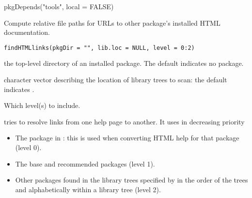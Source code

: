 %
\begin{SeeAlso}\relax
{}
\end{SeeAlso}
%
\begin{Examples}
\begin{ExampleCode}
pkgDepends("tools", local = FALSE)
\end{ExampleCode}
\end{Examples}
%
\begin{Description}\relax
Compute relative file paths for URLs to other package's installed HTML
documentation.
\end{Description}
%
\begin{Usage}
\begin{verbatim}
findHTMLlinks(pkgDir = "", lib.loc = NULL, level = 0:2)
\end{verbatim}
\end{Usage}
%
\begin{Arguments}
\begin{ldescription}
\item[\code{pkgDir}] the top-level directory of an installed package.  The
default indicates no package.
\item[\code{lib.loc}] character vector describing the location of \R{} library
trees to scan: the default indicates .
\item[\code{level}] Which level(s) to include.
\end{ldescription}
\end{Arguments}
%
\begin{Details}\relax
{} tries to resolve links from one help page to
another.  It uses in decreasing priority
\begin{itemize}

\item The package in : this is used when converting
HTML help for that package (level 0).
\item The base and recommended packages (level 1).
\item Other packages found in the library trees specified by
 in the order of the trees and alphabetically within a
library tree (level 2).

\end{itemize}

\end{Details}
